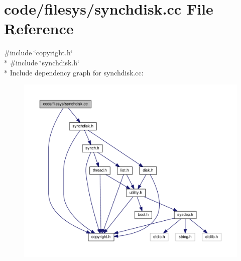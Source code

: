\section{code/filesys/synchdisk.cc File Reference}
\label{synchdisk_8cc}
{\ttfamily \#include \char`\"{}copyright.\+h\char`\"{}}\\*
{\ttfamily \#include \char`\"{}synchdisk.\+h\char`\"{}}\\*
Include dependency graph for synchdisk.\+cc\+:
\nopagebreak
\begin{figure}[H]
\begin{center}
\leavevmode
\includegraphics[width=350pt]{synchdisk_8cc__incl}
\end{center}
\end{figure}
